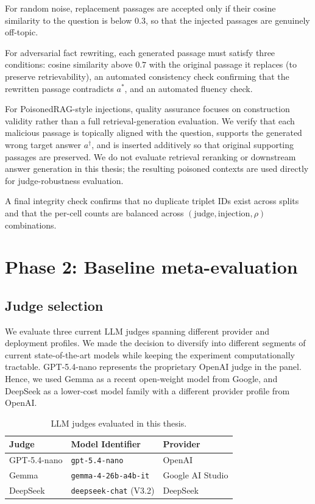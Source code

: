For random noise, replacement passages are accepted only if their cosine similarity to the question is below $0.3$, so that the injected passages are genuinely off-topic.

For adversarial fact rewriting, each generated passage must satisfy three conditions: cosine similarity above $0.7$ with the original passage it replaces (to preserve retrievability), an automated consistency check confirming that the rewritten passage contradicts $a^{*}$, and an automated fluency check.

For PoisonedRAG-style injections, quality assurance focuses on construction validity rather than a full retrieval-generation evaluation. We verify that each malicious passage is topically aligned with the question, supports the generated wrong target answer $a^{\dagger}$, and is inserted additively so that original supporting passages are preserved. We do not evaluate retrieval reranking or downstream answer generation in this thesis; the resulting poisoned contexts are used directly for judge-robustness evaluation.

A final integrity check confirms that no duplicate triplet IDs exist across splits and that the per-cell counts are balanced across $(\mathrm{judge}, \mathrm{injection}, \rho)$ combinations.

\section{Phase 2: Baseline meta-evaluation}
\label{sec:phase2}

\subsection{Judge selection}

We evaluate three current LLM judges spanning different provider and deployment profiles. We made the decision to diversify into different segments of current state-of-the-art models while keeping the experiment computationally tractable. GPT-5.4-nano represents the proprietary OpenAI judge in the panel. Hence, we used Gemma as a recent open-weight model from Google, and DeepSeek as a lower-cost model family with a different provider profile from OpenAI.

\begin{table}[htbp]
\centering
\caption{LLM judges evaluated in this thesis.}
\label{tab:judges}
\small
\begin{tabular}{lll}
\toprule
\textbf{Judge} & \textbf{Model Identifier} & \textbf{Provider} \\
\midrule
GPT-5.4-nano & \texttt{gpt-5.4-nano}        & OpenAI           \\
Gemma        & \texttt{gemma-4-26b-a4b-it}  & Google AI Studio \\
DeepSeek     & \texttt{deepseek-chat} (V3.2) & DeepSeek        \\
\bottomrule
\end{tabular}
\end{table}

